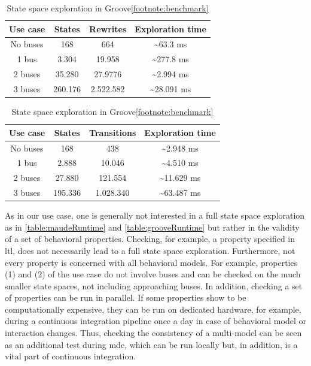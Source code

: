 \documentclass{jot}
\begin{document}
\begin{table}
\centering
\begin{tabular}{|c || c | c | c |}
 \hline
 Use case & States & Rewrites & Exploration time \\
 \hline\hline
 No buses & 168 & 664 & \textasciitilde 63.3 ms \\
 \hline
 1 bus & 3.304 & 19.958 & \textasciitilde 277.8 ms \\
 \hline
 2 buses & 35.280 & 27.9776 & \textasciitilde 2.994 ms \\
 \hline
 3 buses & 260.176 & 2.522.582 & \textasciitilde 28.091 ms \\
 \hline
\end{tabular}
\caption[State space exploration in Maude]{State space exploration in Maude\footnotemark}
\label{table:maudeRuntime}

\bigskip

\begin{tabular}{|c || c | c | c |}
 \hline
 Use case & States & Transitions & Exploration time \\
 \hline\hline
 No buses & 168 & 438 & \textasciitilde 2.948 ms \\
 \hline
 1 bus & 2.888 & 10.046 & \textasciitilde 4.510 ms \\
 \hline
 2 buses & 27.880 & 121.554 & \textasciitilde 11.629 ms \\
 \hline
 3 buses & 195.336 & 1.028.340 & \textasciitilde 63.487 ms \\
 \hline
\end{tabular}
\caption[State space exploration in Groove]{State space exploration in Groove\cref{footnote:benchmark}}
\label{table:grooveRuntime}

\end{table}


As in our use case, one is generally not interested in a full state space exploration as in \autoref{table:maudeRuntime} and \autoref{table:grooveRuntime} but rather in the validity of a set of behavioral properties.
Checking, for example, a property specified in \gls*{ltl}, does not necessarily lead to a full state space exploration.
Furthermore, not every property is concerned with all behavioral models.
For example, properties (1) and (2) of the use case do not involve buses and can be checked on the much smaller state spaces, not including approaching buses.
In addition, checking a set of properties can be run in parallel.
If some properties show to be computationally expensive, they can be run on dedicated hardware, for example, during a continuous integration pipeline once a day in case of behavioral model or interaction changes.
Thus, checking the consistency of a multi-model can be seen as an additional test during \gls*{mde}, which can be run locally but, in addition, is a vital part of continuous integration.
\end{document}
